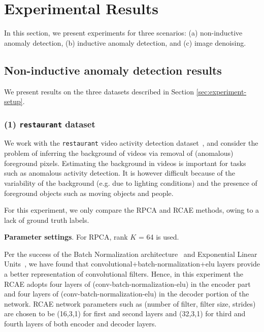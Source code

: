 
\section{Experimental Results}
\label{sec:unsup_experiment-results}

In this section, we present experiments for three scenarios:
(a) non-inductive anomaly detection,
(b) inductive anomaly detection, and
(c) image denoising.

\subsection{Non-inductive anomaly detection results}

We present results on the three datasets described in Section \ref{sec:experiment-setup}.


\subsubsection{{(1) {\tt restaurant} dataset}}
We work with the {\tt restaurant} video activity detection dataset~\cite{xiong2011direct},
and consider the problem of inferring the background of videos via removal of (anomalous) foreground pixels.
Estimating the background in videos is important for tasks such as anomalous activity detection.
It is however difficult because of the variability of the background (e.g. due to lighting conditions) and the presence of foreground objects such as moving objects and people.

For this experiment, we only compare the RPCA and RCAE methods, owing to a lack of ground truth labels.

\textbf{Parameter settings}.
For RPCA, rank $K$ = 64 is used.

Per the success of the Batch Normalization architecture~\cite{ioffe2015batch} and Exponential Linear Units~\cite{clevert2015fast}, we have found that convolutional+batch-normalization+elu layers provide a better representation of convolutional filters.
Hence, in this experiment the RCAE adopts four layers of (conv-batch-normalization-elu) in the encoder part and four layers of  (conv-batch-normalization-elu) in the decoder portion of the network.
RCAE network parameters such as (number of filter, filter size, strides) are chosen to be (16,3,1) for first and second layers and (32,3,1) for third and fourth layers of both encoder and decoder layers.


